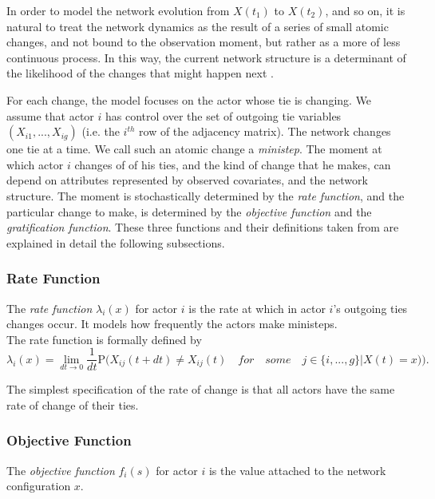 \documentclass[11pt]{report}
\begin{document}
In order to model the network evolution from $X(t_1)$ to $X(t_2)$, and so on, it is natural to treat the network dynamics as the result of a series of small atomic changes, and not bound to the observation moment, but rather as a more of less continuous process. In this way, the current network structure is a determinant of the likelihood of the changes that might happen next \cite{Coleman1964}. 

For each change, the model focuses on the actor whose tie is changing. We assume that actor $i$ has control over the set of outgoing  tie variables $(X_{i1}, ..., X_{ig})$ (i.e. the $i^{th}$ row of the adjacency matrix). The network changes one tie at a time. We call such an atomic change  a \textit{ministep}. The moment at which actor $i$ changes of of his ties, and the kind of change that he makes, can depend on attributes represented by observed covariates, and the network structure. The moment is stochastically determined by the \textit{rate function}, and the particular change to make, is determined by the \textit{objective function} and the \textit{gratification function}. These three functions and their definitions taken from \cite{Snijders2004} are explained in detail the following subsections.

\subsubsection{Rate Function}

The \textit{rate function} $\lambda_i(x)$ for actor $i$ is the rate at which in actor $i$'s outgoing ties changes occur. It models how frequently the actors make ministeps.\\
The rate function is formally defined \cite{Snijders2004} by
\begin{equation}
\lambda_i(x) = \lim_{dt \to 0} \frac{1}{dt} \mathrm {P} \big({X_{ij}(t + dt) \neq X_{ij}(t) \quad for \quad some \quad j \in \{i, ..., g\} | X(t) = x)}\big).
\end{equation}

The simplest specification of the rate of change is that all actors have the same rate of change of their ties. 

\subsubsection{Objective Function}

The \textit{objective function} $f_i(s)$ for actor $i$ is the value attached to the network configuration $x$. 
\end{document}

